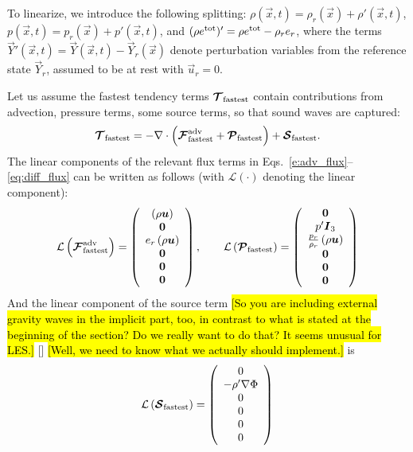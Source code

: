 \documentclass{article}
\begin{document}
To linearize, we introduce the following splitting: $\rho(\vec{x},t)=\rho_r(\vec{x}) + \rho'(\vec{x},t)$,  $p(\vec{x},t)=p_r(\vec{x}) + p'(\vec{x},t)$, and $(\rho e^{\mathrm{tot}})'=\rho e^{\mathrm{tot}} - \rho_r e_r$, where the terms $\vec{Y}'(\vec{x},t)=\vec{Y}(\vec{x},t)-\vec{Y}_r(\vec{x})$ denote perturbation variables from the reference state  $\vec{Y}_r$, assumed to be at rest with $\vec{u}_r = 0$.
 
Let us assume the fastest tendency terms $\boldsymbol{{\mathcal{T}}}_{\mathrm{fastest}}$ contain contributions from advection, pressure terms, some source terms, so that sound waves are captured:
 \[
 \boldsymbol{{\mathcal{T}}}_{\mathrm{fastest}}=-\nabla \cdot \left( \boldsymbol{{\mathcal{F}}}^{\mathrm{adv}}_{\mathrm{fastest}} + \boldsymbol{{\mathcal{P}}}_{\mathrm{fastest}}\right) + \boldsymbol{{\mathcal{S}}}_{\mathrm{fastest}}.
 \]
The linear components of the relevant flux terms in Eqs.\ \eqref{e:adv_flux}--\eqref{eq:diff_flux} can be written as follows (with $\mathcal{L}(\cdot)$ denoting the linear component): 
 \begin{equation}
 \mathcal{L}\left(\boldsymbol{{\mathcal{F}}}^{\mathrm{adv}}_{\mathrm{fastest}}\right)=\left( \begin{array}{c}
 \left(\rho \boldsymbol{{u}}\right) \\
 \boldsymbol{{0}} \\
 e_r \left(\rho \boldsymbol{{u}}\right)\\
\boldsymbol{{0}}\\
\boldsymbol{{0}} \\
\boldsymbol{{0}}
\end{array}
\right), 
\qquad
\mathcal{L}\left(\boldsymbol{{\mathcal{P}}}_{\mathrm{fastest}}\right)= \left( \begin{array}{c}
\boldsymbol{{0}} \\
p' \boldsymbol{{I}}_3 \\
\frac{p_r}{\rho_r} \left( \rho \boldsymbol{{u}}\right)\\
\boldsymbol{{0}} \\
\boldsymbol{{0}} \\
\boldsymbol{{0}} 
\end{array}
\right)
\label{eq:fluxes_linear}
\end{equation}
And the linear component of the source term \hl{[So you are including external gravity waves  in the implicit part, too, in contrast to what is stated at the beginning of the section? Do we really want to do that? It seems unusual for LES.]}
[] \hl{[Well, we need to know what we actually should implement.]}
is 
\begin{equation}
\mathcal{L}\left( \boldsymbol{{\mathcal{S}}}_{\mathrm{fastest}}\right) = \left( \begin{array}{c}
 0 \\
 - \rho' \nabla\Phi  \\
0 \\
0 \\
0 \\
0
\end{array}
\right)
\end{equation}
\end{document}
